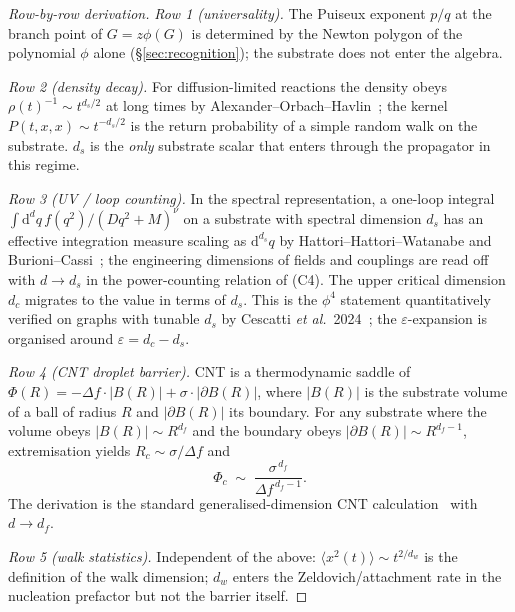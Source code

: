 \documentclass[11pt,a4paper]{article}
\newcommand{\dd}{\mathrm{d}}
\theoremstyle{plain}
\begin{document}
\begin{proof}[Row-by-row derivation]
\emph{Row 1 (universality).} The Puiseux exponent $p/q$ at the
branch point of $G = z\phi(G)$ is determined by the Newton polygon
of the polynomial $\phi$ alone (\S\ref{sec:recognition}); the
substrate does not enter the algebra.

\emph{Row 2 (density decay).} For diffusion-limited reactions the
density obeys $\rho(t)^{-1} \sim t^{d_s/2}$ at long times by
Alexander--Orbach--Havlin~\citep{AlexanderOrbach,Havlin,BenAvrahamHavlin2000};
the kernel $P(t,x,x) \sim t^{-d_s/2}$ is the return probability
of a simple random walk on the substrate.  $d_s$ is the
\emph{only} substrate scalar that enters through the propagator
in this regime.

\emph{Row 3 (UV / loop counting).} In the spectral
representation, a one-loop integral
$\int \dd^d q\,f(q^2)/(D q^2 + M)^\nu$ on a substrate with
spectral dimension $d_s$ has an effective integration measure
scaling as $\dd^{d_s} q$ by Hattori--Hattori--Watanabe and
Burioni--Cassi~\citep{Hattori,BurioniCassi1996}; the engineering
dimensions of fields and couplings are read off with $d \to d_s$
in the power-counting relation of (C4).  The upper critical
dimension $d_c$ migrates to the value in terms of $d_s$.  This
is the $\phi^4$ statement quantitatively verified on graphs with
tunable $d_s$ by Cescatti \textit{et al.}\ 2024~\citep{Cescatti2024};
the $\varepsilon$-expansion is organised around
$\varepsilon = d_c - d_s$.

\emph{Row 4 (CNT droplet barrier).} CNT is a thermodynamic
saddle of $\Phi(R) = -\Delta f \cdot |B(R)| + \sigma \cdot
|\partial B(R)|$, where $|B(R)|$ is the substrate volume of a
ball of radius $R$ and $|\partial B(R)|$ its boundary.  For any
substrate where the volume obeys $|B(R)| \sim R^{d_f}$ and the
boundary obeys $|\partial B(R)| \sim R^{d_f - 1}$,
extremisation yields
$R_c \sim \sigma/\Delta f$ and
\begin{equation}\label{eq:cnt-fractal}
  \Phi_c \;\sim\;
  \frac{\sigma^{\,d_f}}{\Delta f^{\,d_f - 1}}.
\end{equation}
The derivation is the standard generalised-dimension CNT
calculation~\citep{Langer1969,BinderStauffer1976,BinderOverview2016}
with $d \to d_f$.

\emph{Row 5 (walk statistics).} Independent of the above:
$\langle x^2(t)\rangle \sim t^{2/d_w}$ is the definition of
the walk dimension; $d_w$ enters the Zeldovich/attachment rate
in the nucleation prefactor but not the barrier itself.
\end{proof}
\end{document}
